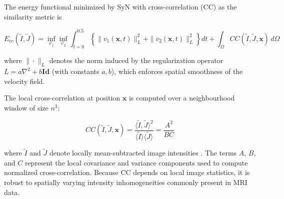 The energy functional minimized by SyN with cross-correlation (CC) as the similarity metric is \cite{avants_symmetric_2008}

\begin{equation}
	E_{cc}(\tilde{I},\tilde{J}) =
	\inf_{\varphi_1} \inf_{\varphi_2}
	\int_{t=0}^{0.5}
	\left\{
	\|v_1(\mathbf{x},t)\|_L^2 + \|v_2(\mathbf{x},t)\|_L^2
	\right\} dt
	+ \int_\Omega CC(\tilde{I}, \tilde{J}, \mathbf{x})\, d\Omega
	\label{eq:syn_energy}
\end{equation}

where $\|\cdot\|_L$ denotes the norm induced by the regularization operator $L = a\nabla^2 + b\mathbf{Id}$ (with constants $a, b$), which enforces spatial smoothness of the velocity field.

The local cross-correlation at position $\mathbf{x}$ is computed over a neighbourhood window of size $n^3$:

\begin{equation}
	CC(\tilde{I}, \tilde{J}, \mathbf{x})
	= \frac{\langle \tilde{I}, \tilde{J} \rangle^2}{\langle \tilde{I} \rangle\langle \tilde{J} \rangle}
	= \frac{A^2}{BC}
	\label{eq:cc}
\end{equation}

where $\tilde{I}$ and $\tilde{J}$ denote locally mean-subtracted image intensities \cite{avants_symmetric_2008}. The terms $A$, $B$, and $C$ represent the local covariance and variance components used to compute normalized cross-correlation. Because CC depends on local image statistics, it is robust to spatially varying intensity inhomogeneities commonly present in MRI data.



